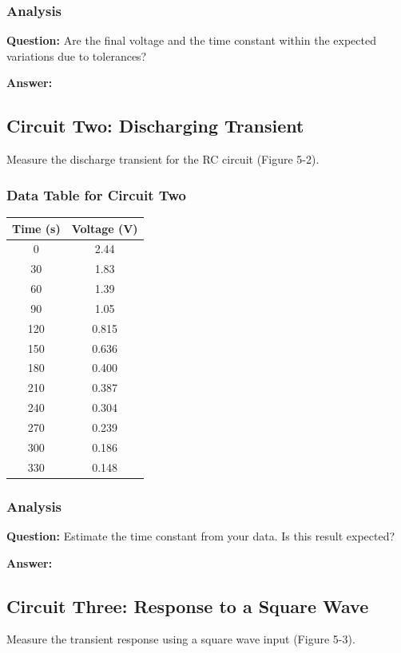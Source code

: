 \documentclass[12pt]{article}
\begin{document}
\subsubsection{Analysis}
\textbf{Question:} Are the final voltage and the time constant within the expected variations due to tolerances?

\textbf{Answer:} \\

\subsection{Circuit Two: Discharging Transient}
Measure the discharge transient for the RC circuit (Figure 5-2).

\subsubsection{Data Table for Circuit Two}
\begin{tabular}{c|c}
	\hline
	Time (s) & Voltage (V) \\
	\hline
	0        & 2.44        \\
	30       & 1.83        \\
	60       & 1.39        \\
	90       & 1.05        \\
	120      & 0.815       \\
	150      & 0.636       \\
	180      & 0.400       \\
	210      & 0.387       \\
	240      & 0.304       \\
	270      & 0.239       \\
	300      & 0.186       \\
	330      & 0.148       \\
	\hline
\end{tabular}

\subsubsection{Analysis}
\textbf{Question:} Estimate the time constant from your data. Is this result expected?

\textbf{Answer:} \\

\subsection{Circuit Three: Response to a Square Wave}
Measure the transient response using a square wave input (Figure 5-3).
\end{document}
